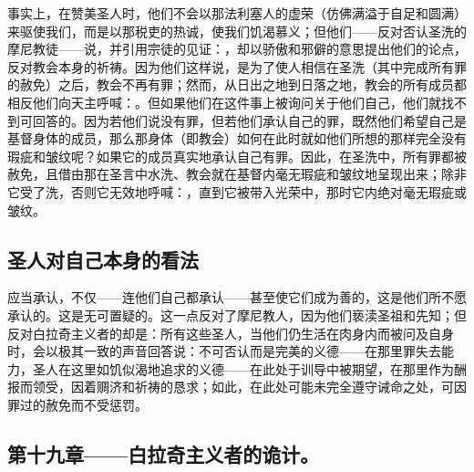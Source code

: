 事实上，在赞美圣人时，他们不会以那法利塞人的虚荣（仿佛满溢于自足和圆满）来驱使我们，而是以那税吏的热诚，使我们饥渴慕义；但他们——反对否认圣洗的摩尼教徒——说，并引用宗徒的见证：，却以骄傲和邪僻的意思提出他们的论点，反对教会本身的祈祷。因为他们这样说，是为了使人相信在圣洗（其中完成所有罪的赦免）之后，教会不再有罪；然而，从日出之地到日落之地，教会的所有成员都相反他们向天主呼喊：。但如果他们在这件事上被询问关于他们自己，他们就找不到可回答的。因为若他们说没有罪，但若他们承认自己的罪，既然他们希望自己是基督身体的成员，那么那身体（即教会）如何在此时就如他们所想的那样完全没有瑕疵和皱纹呢？如果它的成员真实地承认自己有罪。因此，在圣洗中，所有罪都被赦免，且借由那在圣言中水洗、教会就在基督内毫无瑕疵和皱纹地呈现出来；除非它受了洗，否则它无效地呼喊：，直到它被带入光荣中，那时它内绝对毫无瑕疵或皱纹。\par


\subsection{圣人对自己本身的看法}

应当承认，不仅——连他们自己都承认——甚至使它们成为善的，这是他们所不愿承认的。这是无可置疑的。这一点反对了摩尼教人，因为他们亵渎圣祖和先知；但反对白拉奇主义者的却是：所有这些圣人，当他们仍生活在肉身内而被问及自身时，会以极其一致的声音回答说：不可否认而是完美的义德——在那里罪失去能力，圣人在这里如饥似渴地追求的义德——在此处于训导中被期望，在那里作为酬报而领受，因着赒济和祈祷的恳求；如此，在此处可能未完全遵守诫命之处，可因罪过的赦免而不受惩罚。\par


\subsection{第十九章——白拉奇主义者的诡计。}

